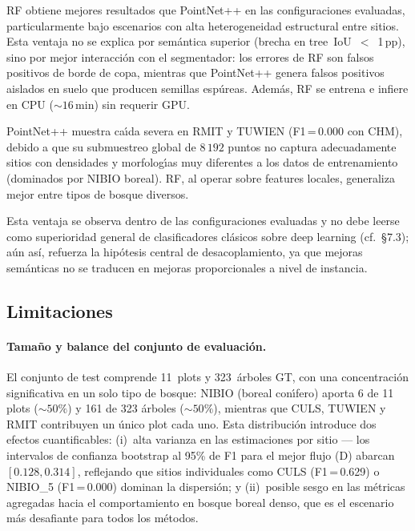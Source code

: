 \documentclass[runningheads]{llncs}
\begin{document}
RF obtiene mejores resultados que PointNet++ en las configuraciones evaluadas, particularmente bajo escenarios con alta heterogeneidad estructural entre sitios. Esta ventaja no se explica por sem\'antica superior (brecha en tree~IoU~$<$~1\,pp), sino por mejor interacci\'on con el segmentador: los errores de RF son falsos positivos de borde de copa, mientras que PointNet++ genera falsos positivos aislados en suelo que producen semillas esp\'ureas. Adem\'as, RF se entrena e infiere en CPU (${\sim}16$\,min) sin requerir GPU.

PointNet++ muestra ca\'\i{}da severa en RMIT y TUWIEN (F1\,=\,0.000 con CHM), debido a que su submuestreo global de $8\,192$ puntos no captura adecuadamente sitios con densidades y morfolog\'\i{}as muy diferentes a los datos de entrenamiento (dominados por NIBIO boreal). RF, al operar sobre features locales, generaliza mejor entre tipos de bosque diversos.

Esta ventaja se observa dentro de las configuraciones evaluadas y no debe leerse como superioridad general de clasificadores clásicos sobre deep learning (cf.\ §7.3); aún así, refuerza la hipótesis central de desacoplamiento, ya que mejoras semánticas no se traducen en mejoras proporcionales a nivel de instancia.

\subsection{Limitaciones}

\paragraph{Tama\~no y balance del conjunto de evaluaci\'on.}
El conjunto de test comprende 11~plots y 323~\'arboles GT, con una concentraci\'on significativa en un solo tipo de bosque: NIBIO (boreal con\'\i{}fero) aporta 6 de 11 plots (${\sim}50\%$) y 161 de 323 \'arboles (${\sim}50\%$), mientras que CULS, TUWIEN y RMIT contribuyen un \'unico plot cada uno. Esta distribuci\'on introduce dos efectos cuantificables: (i)~alta varianza en las estimaciones por sitio --- los intervalos de confianza bootstrap al 95\% de F1 para el mejor flujo (D) abarcan $[0.128, 0.314]$, reflejando que sitios individuales como CULS (F1\,=\,0.629) o NIBIO\_5 (F1\,=\,0.000) dominan la dispersi\'on; y (ii)~posible sesgo en las m\'etricas agregadas hacia el comportamiento en bosque boreal denso, que es el escenario m\'as desafiante para todos los m\'etodos.
\end{document}
